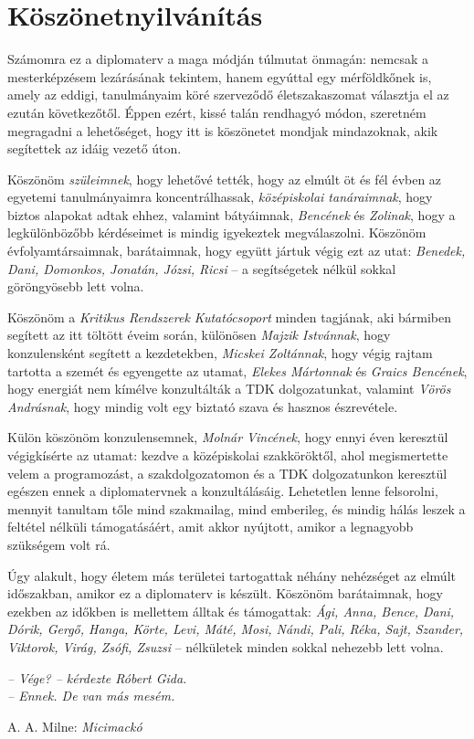 \selecthungarian
\chapter*{Köszönetnyilvánítás}

Számomra ez a diplomaterv a maga módján túlmutat önmagán: nemcsak a mesterképzésem lezárásának tekintem, hanem egyúttal egy mérföldkőnek is, amely az eddigi, tanulmányaim köré szerveződő életszakaszomat választja el az ezután következőtől. Éppen ezért, kissé talán rendhagyó módon, szeretném megragadni a lehetőséget, hogy itt is köszönetet mondjak mindazoknak, akik segítettek az idáig vezető úton.

Köszönöm \textit{szüleimnek}, hogy lehetővé tették, hogy az elmúlt öt és fél évben az egyetemi tanulmányaimra koncentrálhassak, \textit{középiskolai tanáraimnak}, hogy biztos alapokat adtak ehhez, valamint bátyáimnak, \textit{Bencének} és \textit{Zolinak}, hogy a legkülönbözőbb kérdéseimet is mindig igyekeztek megválaszolni. Köszönöm évfolyamtársaimnak, barátaimnak, hogy együtt jártuk végig ezt az utat: \textit{Benedek, Dani, Domonkos, Jonatán, Józsi, Ricsi} – a segítségetek nélkül sokkal göröngyösebb lett volna.

Köszönöm a \textit{Kritikus Rendszerek Kutatócsoport} minden tagjának, aki bármiben segített az itt töltött éveim során, különösen \textit{Majzik Istvánnak}, hogy konzulensként segített a kezdetekben, \textit{Micskei Zoltánnak}, hogy végig rajtam tartotta a szemét és egyengette az utamat, \textit{Elekes Mártonnak} és \textit{Graics Bencének}, hogy energiát nem kímélve konzultálták a TDK dolgozatunkat, valamint \textit{Vörös Andrásnak}, hogy mindig volt egy biztató szava és hasznos észrevétele.

Külön köszönöm konzulensemnek, \textit{Molnár Vincének}, hogy ennyi éven keresztül végigkísérte az utamat: kezdve a középiskolai szakköröktől, ahol megismertette velem a programozást, a szakdolgozatomon és a TDK dolgozatunkon keresztül egészen ennek a diplomatervnek a konzultálásáig. Lehetetlen lenne felsorolni, mennyit tanultam tőle mind szakmailag, mind emberileg, és mindig hálás leszek a feltétel nélküli támogatásáért, amit akkor nyújtott, amikor a legnagyobb szükségem volt rá.

Úgy alakult, hogy életem más területei tartogattak néhány nehézséget az elmúlt időszakban, amikor ez a diplomaterv is készült.
Köszönöm barátaimnak, hogy ezekben az időkben is mellettem álltak és támogattak: \textit{Ági, Anna, Bence, Dani, Dórik, Gergő, Hanga, Körte, Levi, Máté, Mosi, Nándi, Pali, Réka, Sajt, Szander, Viktorok, Virág, Zsófi, Zsuzsi} – nélkületek minden sokkal nehezebb lett volna.

\epigraph{\textit{– Vége? – kérdezte Róbert Gida. \\
– Ennek. De van más mesém.}}{A. A. Milne: \textit{Micimackó}}

\selectenglish
